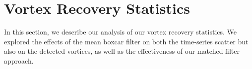 \documentclass[linenumbers,trackchanges]{aastex63}
\begin{document}
%

\vspace{5mm}





\appendix

\section{Vortex Recovery Statistics}
\label{sec:Vortex Recovery Statistics}
In this section, we describe our analysis of our vortex recovery statistics. We explored the effects of the mean boxcar filter on both the time-series scatter but also on the detected vortices, as well as the effectiveness of our matched filter approach.
\end{document}
